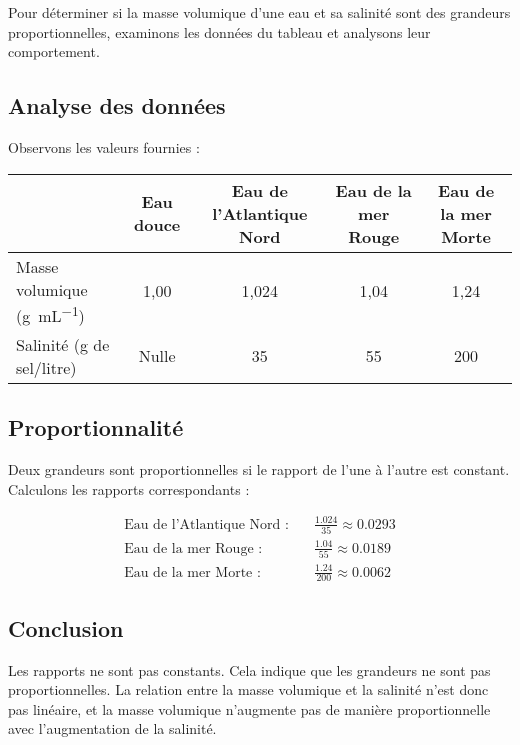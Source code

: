 \documentclass[answers]{exam}
\begin{document}
\begin{solution}
Pour déterminer si la masse volumique d'une eau et sa salinité sont des grandeurs proportionnelles, examinons les données du tableau et analysons leur comportement.

\subsection*{Analyse des données}
Observons les valeurs fournies :

\begin{center}
\begin{tabular}{|l|c|c|c|c|}
\hline
& Eau douce & Eau de l'Atlantique Nord & Eau de la mer Rouge & Eau de la mer Morte \\
\hline
Masse volumique (\si{\gram\per\milli\liter}) & 1,00 & 1,024 & 1,04 & 1,24 \\
\hline
Salinité (g de sel/litre) & Nulle & 35 & 55 & 200 \\
\hline
\end{tabular}
\end{center}

\subsection*{Proportionnalité}
Deux grandeurs sont proportionnelles si le rapport de l'une à l'autre est constant. Calculons les rapports correspondants :

\begin{align*}
\text{Eau de l'Atlantique Nord :} & \quad \frac{1.024}{35} \approx 0.0293 \\
\text{Eau de la mer Rouge :} & \quad \frac{1.04}{55} \approx 0.0189 \\
\text{Eau de la mer Morte :} & \quad \frac{1.24}{200} \approx 0.0062
\end{align*}

\subsection*{Conclusion}
Les rapports ne sont pas constants. Cela indique que les grandeurs ne sont pas proportionnelles. La relation entre la masse volumique et la salinité n'est donc pas linéaire, et la masse volumique n'augmente pas de manière proportionnelle avec l'augmentation de la salinité.
\end{solution}
\end{document}
